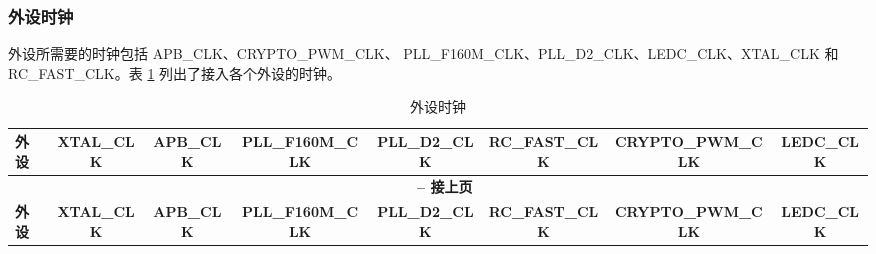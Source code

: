 \documentclass[main\_\_CN.tex]{subfiles}
\begin{document}
\subsubsection{外设时钟}
外设所需要的时钟包括 APB\_CLK、CRYPTO\_PWM\_CLK、 PLL\_F160M\_CLK、PLL\_D2\_CLK、LEDC\_CLK、XTAL\_CLK 和 RC\_FAST\_CLK。表 \ref{tab:resclk-periph-clks} 列出了接入各个外设的时钟。

\begin{landscape}
\begin{longtable}[c]{|p{2.5cm}|c|c|c|c|c|c|c| }
 \caption{外设时钟}
    \label{tab:resclk-periph-clks} \\\hline

    \rowcolor{lightgray}
        \textbf{外设} & \textbf{XTAL\_CLK} & \textbf{APB\_CLK} & \textbf{PLL\_F160M\_CLK} & \textbf{PLL\_D2\_CLK} & \textbf{RC\_FAST\_CLK} & \textbf{CRYPTO\_PWM\_CLK} & \textbf{LEDC\_CLK}\\\hline
        \endfirsthead

    \multicolumn{8}{c}{\bfseries \tablename\ \thetable{} -- 接上页}\\\hline

    \rowcolor{lightgray}
        \textbf{外设} & \textbf{XTAL\_CLK} & \textbf{APB\_CLK} & \textbf{PLL\_F160M\_CLK} & \textbf{PLL\_D2\_CLK} & \textbf{RC\_FAST\_CLK} & \textbf{CRYPTO\_PWM\_CLK} & \textbf{LEDC\_CLK}\\\hline
    \endhead


\end{longtable}
\end{landscape}
\end{document}
